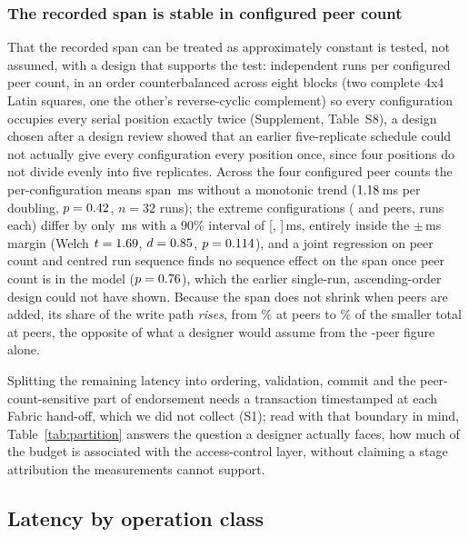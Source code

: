 \documentclass[a4paper,fleqn]{cas-sc}
\begin{document}


\subsubsection{The recorded span is stable in configured peer count}
\label{subsubsec:acinvariance}

That the recorded span can be treated as approximately constant is tested,
not assumed, with a design that supports the test: \PartRunsPerConfig{}
independent runs per configured peer count, in an order counterbalanced
across eight blocks (two complete 4x4 Latin squares, one the other's
reverse-cyclic complement) so every configuration occupies every serial
position exactly twice (Supplement, Table~S8), a design chosen after a
  design review showed that an earlier five-replicate schedule could not
actually give every configuration every position once, since four
positions do not divide evenly into five replicates. Across the four
configured peer counts the per-configuration means span \PartSpread\,ms
without a monotonic trend ($1.18$\,ms per doubling,
$p=0.42$, $n=32$ runs); the extreme configurations (\ScaleMinPeers{}
and \ScaleMaxPeers{} peers, \PartRunsPerConfig{} runs each) differ by only
\PartTostDiff\,ms with a 90\% interval of [\PartTostLow,
\PartTostHigh]\,ms, entirely inside the $\pm$\DecisionMargin\,ms margin
(Welch $t=1.69$, $d=0.85$, $p=0.114$), and a
joint regression on peer count and centred run sequence finds no sequence
effect on the span once peer count is in the model
($p=0.76$), which the earlier single-run, ascending-order
design could not have shown. Because the span does not shrink when peers
are added, its share of the write path \emph{rises}, from
\PartAccessPct\% at \ScaleMinPeers{} peers to \PartAccessPctAtMax\% of the
smaller total at \ScaleMaxPeers{} peers, the opposite of what a designer
would assume from the \ScaleMinPeers-peer figure alone.

Splitting the remaining latency into ordering, validation, commit and the
peer-count-sensitive part of endorsement needs a transaction timestamped at
each Fabric hand-off, which we did not collect (S1); read with that
boundary in mind, Table~\ref{tab:partition} answers the question a designer
actually faces, how much of the budget is associated with the
access-control layer, without claiming a stage attribution the
measurements cannot support.

\subsection{Latency by operation class}
\label{subsec:byclass}
\end{document}
